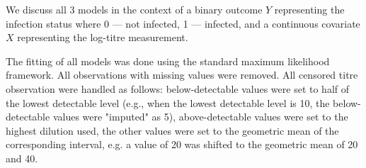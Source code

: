 We discuss all 3 models in the context of a binary outcome $Y$ representing the infection status where 0 --- not infected, 1 --- infected, and a continuous covariate $X$ representing the log-titre measurement.

The fitting of all models was done using the standard maximum likelihood framework. All observations with missing values were removed. All censored titre observation were handled as follows: below-detectable values were set to half of the lowest detectable level (e.g., when the lowest detectable level is 10, the below-detectable values were "imputed" as 5), above-detectable values were set to the highest dilution used, the other values were set to the geometric mean of the corresponding interval, e.g. a value of 20 was shifted to the geometric mean of 20 and 40.
